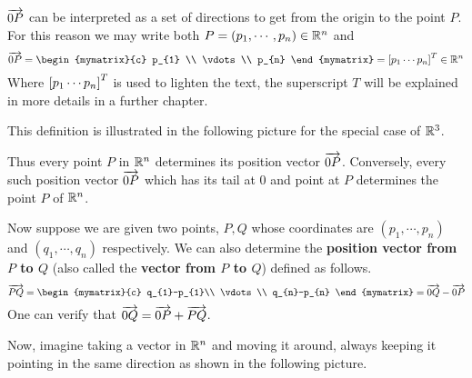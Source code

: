 $\overrightarrow{0P}$ can be interpreted as a set of directions to get from the origin to the point $P$.
For this reason we may write both $P=\left( p_{1},\cdots ,p_{n}\right)  \in \mathbb{R}^{n}$
and  $$\longvect{0P}= \begin{mymatrix}{c}
p_{1} \\
\vdots \\
p_{n}
\end{mymatrix} = \leftB p_{1} \cdots p_{n} \rightB^T \in \R^{n}$$ 
Where $\left[ p_{1} \cdots p_{n} \right]^T$ is used to lighten the text, the superscript $T$ will be explained in more details in a further chapter.

This definition is illustrated in the following picture for the
special case of $\mathbb{R}^{3}$.

\begin{center}
\end{center}

Thus every point $P$ in $\mathbb{R}^{n}$ determines its position
vector $\overrightarrow{0P}$. Conversely, every such position vector $\overrightarrow{0P}$
which has its tail at $0$ and point at $P$ determines the point $P$ of
$\mathbb{R}^{n}$.

Now suppose we are given two points, $P,Q$ whose
coordinates are $\left( p_{1},\cdots ,p_{n}\right) $ and $\left(
q_{1},\cdots ,q_{n}\right) $ respectively. We can also determine the
\textbf{position vector from $P$ to $Q$} (also called the \textbf{vector from $P$ to $Q$}) defined as follows.
\begin{equation*}
\longvect{PQ} = \begin{mymatrix}{c}
q_{1}-p_{1}\\
 \vdots \\
q_{n}-p_{n}
\end{mymatrix} = \longvect{0Q} - \longvect{0P}
\end{equation*}
One can verify that $\overrightarrow{0Q}=\overrightarrow{0P}+\overrightarrow{PQ}$.

Now, imagine taking a vector in $\mathbb{R}^n$ and moving it around, always
keeping it pointing in the same direction as shown in the following picture.

